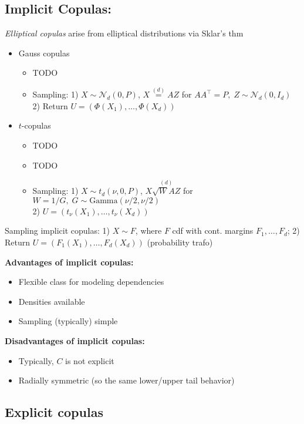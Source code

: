\subsection*{Implicit Copulas:}
\textit{Elliptical copulas} arise from elliptical distributions via Sklar's thm
\begin{itemize}
    \item Gauss copulas
    \begin{itemize}
        \item TODO
        \item Sampling: 1) $X\sim\mathcal{N}_d(0,P)$, $X\stackrel{(d)}{=}AZ$ for $AA^\top=P,\; Z\sim\mathcal{N}_d(0,I_d)$\\
        2) Return $U=(\Phi(X_1),\dots,\Phi(X_d))$
    \end{itemize}
    \item $t$-copulas
    \begin{itemize}
        \item TODO
        \item TODO
        \item Sampling: 1) $X\sim t_d(\nu, 0, P)$,  $X\stackrel{(d)}{\sqrt{W}AZ}$ for $W=1/G,\; G\sim \text{Gamma}(\nu/2, \nu/2)$\\
        2) $U=(t_\nu(X_1),\dots,t_\nu(X_d))$
    \end{itemize}
\end{itemize}
Sampling implicit copulas: 1) $X\sim F$, where $F$ cdf with cont. margins $F_1,\dots,F_d$; 2) Return $U=(F_1(X_1),\dots,F_d(X_d))$ (probability trafo)

\textbf{Advantages of implicit copulas:}
\begin{itemize}
    \item Flexible class for modeling dependencies
    \item Densities available
    \item Sampling (typically) simple
\end{itemize}

\textbf{Disadvantages of implicit copulas:}
\begin{itemize}
    \item Typically, $C$ is not explicit
    \item Radially symmetric (so the same lower/upper tail behavior)
\end{itemize}

\subsection*{Explicit copulas}
